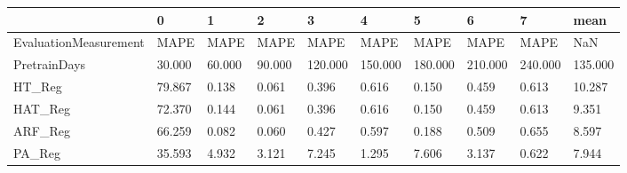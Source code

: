 \begin{tabular}{llllllllll}
\toprule
{} &      0 &      1 &      2 &       3 &       4 &       5 &       6 &       7 &    mean \\
\midrule
EvaluationMeasurement &   MAPE &   MAPE &   MAPE &    MAPE &    MAPE &    MAPE &    MAPE &    MAPE &     NaN \\
PretrainDays          & 30.000 & 60.000 & 90.000 & 120.000 & 150.000 & 180.000 & 210.000 & 240.000 & 135.000 \\
HT\_Reg                & 79.867 &  0.138 &  0.061 &   0.396 &   0.616 &   0.150 &   0.459 &   0.613 &  10.287 \\
HAT\_Reg               & 72.370 &  0.144 &  0.061 &   0.396 &   0.616 &   0.150 &   0.459 &   0.613 &   9.351 \\
ARF\_Reg               & 66.259 &  0.082 &  0.060 &   0.427 &   0.597 &   0.188 &   0.509 &   0.655 &   8.597 \\
PA\_Reg                & 35.593 &  4.932 &  3.121 &   7.245 &   1.295 &   7.606 &   3.137 &   0.622 &   7.944 \\
\bottomrule
\end{tabular}
